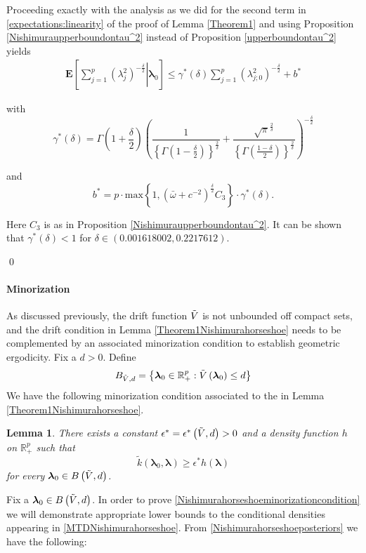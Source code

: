 \documentclass[noinfoline,11pt]{imsart}
\numberwithin{equation}{section}
\theoremstyle{plain}
\newtheorem{lem}{Lemma}[section]
\newcommand{\bl}{\boldsymbol{\lambda}}
\newcommand{\E}{\boldsymbol{E}}
\begin{document}
 Proceeding exactly with the analysis as we did for the second term in \eqref{expectations:linearity} of the proof of 
Lemma \ref{Theorem1} and using Proposition \ref{Nishimuraupperboundontau^2} instead of 
Proposition \ref{upperboundontau^2} yields 
\begin{eqnarray}\label{Nishimuradrift:1}
   \E\left[\left.\sum_{j=1}^p\left(\lambda_j^2\right)^{-\frac{\delta}{2}}\right|\mathbf{\bl}_0\right]\leq \gamma^*\left(\delta\right)\sum_{j=1}^p\left(\lambda_{j;0}^2\right)^{-\frac{\delta}{2}}+b^*
\end{eqnarray}

\noindent

with 
$$
\gamma^*\left(\delta\right)=\Gamma\left(1+\frac{\delta}{2}\right)\left(\frac{1}{\left\{\Gamma\left(1-\frac{\delta}{2}\right)\right\}^{\frac{2}{\delta}}}+\frac{\sqrt{\pi}^{\frac{2}{\delta}}}{\left\{\Gamma\left(\frac{1-\delta}{2}\right)\right\}^{\frac{2}{\delta}}}\right)^{-\frac{\delta}{2}} 
$$

\noindent
and 
$$
b^*=p\cdot\text{max}\left\{1,(\bar{\omega}+c^{-2})^{\frac{\delta}{2}}C_3\right\}\cdot\gamma^*\left(\delta\right). 
$$ 

\noindent
Here $C_3$ is as in Proposition \ref{Nishimuraupperboundontau^2}. It can be shown that $\gamma^* \left( \delta \right) < 1$ for $\delta\in (0.001618002, 0.2217612) $. 

\qed 
\paragraph{Minorization} As discussed previously, the drift function $\Tilde{V}$ is not unbounded off compact sets, and the drift condition in Lemma \ref{Theorem1Nishimurahorseshoe} needs to be complemented by an associated minorization condition to establish geometric ergodicity. Fix a $d>0$. Define
\begin{equation}\label{Nishimurahorseshoeminorizationset}
    B_{\Tilde{V},d}=\left\{\bl_0\in\mathbb{R}_+^p:\Tilde{V}\left(\bl_0\right)\leq d\right\}
\end{equation}
We have the following minorization condition associated to the  in Lemma \ref{Theorem1Nishimurahorseshoe}.
\begin{lem}\label{Theorem2Nishimurahorseshoe}
There exists a constant $\epsilon^*=\epsilon^*\left(\Tilde{V},d\right)>0$ and a density function $h$ on $\mathbb{R}_+^p$ such that
\begin{equation}\label{Nishimurahorseshoeminorizationcondition}
   \tilde k\left(\bl_0,\bl\right)\geq \epsilon^* h\left(\bl\right) 
\end{equation}
for every $\bl_0\in B\left(\Tilde{V},d\right)$.
\end{lem}
\proof Fix a $\bl_0\in B\left(\Tilde{V},d\right)$. In order to prove \eqref{Nishimurahorseshoeminorizationcondition} we will demonstrate appropriate lower bounds to the conditional densities appearing in \eqref{MTDNishimurahorseshoe}. From \eqref{Nishimurahorseshoeposteriors} we have the following:
\end{document}
